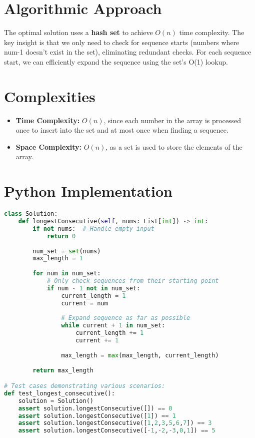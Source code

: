 \section*{Algorithmic Approach}
The optimal solution uses a \textbf{hash set} to achieve \(O(n)\) time complexity. The key insight is that we only need to check for sequence starts (numbers where num-1 doesn't exist in the set), eliminating redundant checks. For each sequence start, we can efficiently expand the sequence using the set's O(1) lookup.

\section*{Complexities}

\begin{itemize}
	\item \textbf{Time Complexity:} \(O(n)\), since each number in the array is processed once to insert into the set and at most once when finding a sequence.
	\item \textbf{Space Complexity:} \(O(n)\), as a set is used to store the elements of the array.
\end{itemize}

\newpage %
\section*{Python Implementation}

\begin{fullwidth}
\begin{lstlisting}[language=Python]
class Solution:
    def longestConsecutive(self, nums: List[int]) -> int:
        if not nums:  # Handle empty input
            return 0
            
        num_set = set(nums)
        max_length = 1
        
        for num in num_set:
            # Only check sequences from their starting point
            if num - 1 not in num_set:
                current_length = 1
                current = num
                
                # Expand sequence as far as possible
                while current + 1 in num_set:
                    current_length += 1
                    current += 1
                
                max_length = max(max_length, current_length)
        
        return max_length

# Test cases demonstrating various scenarios:
def test_longest_consecutive():
    solution = Solution()
    assert solution.longestConsecutive([]) == 0
    assert solution.longestConsecutive([1]) == 1
    assert solution.longestConsecutive([1,2,3,5,6,7]) == 3
    assert solution.longestConsecutive([-1,-2,-3,0,1]) == 5
\end{lstlisting}
\end{fullwidth}

